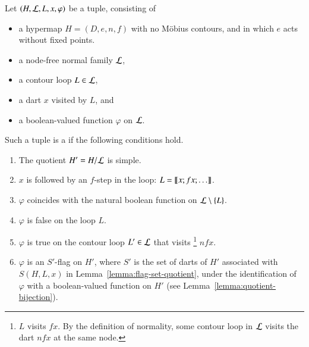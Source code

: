 \begin{definition}\label{def:marked}
Let $(H,{\cal L},L,x,\varphi)$ be a tuple, consisting of 
\begin{itemize}
\item a hypermap $H=(D,e,n,f)$ with no M\"obius contours, and in which $e$ acts without 
fixed points.  %
\item a node-free normal family ${\cal L}$, 
\item a contour loop $L\in{\cal L}$, 
\item a dart $x$ visited by $L$,
and 
\item a  boolean-valued function $\varphi$ on ${\cal L}$.
\end{itemize}
Such a tuple is a  if
the following conditions hold.
\begin{enumerate}
\item The quotient $H'=H/{\cal L}$ is simple.  
\item $x$ is followed by an $f$-step in the loop: $L = {\llbracket{x;fx;\ldots}\rrbracket}$.
\item $\varphi$ coincides with the natural boolean function on ${\cal L}\setminus \{L\}$.
\item $\varphi$ is false on the loop $L$.
\item $\varphi$ is true on the contour loop $L'\in {\cal L}$ that visits%
\footnote{$L$ visits  $f x$.  By the definition of normality, some contour loop in
${\cal L}$ visits the dart $n f x$ at the same node.} 
$n f x$.
\item 
  $\varphi$ is an $S'$-flag on $H'$, where $S'$ is the set of darts of $H'$
  associated with $S(H,L,x)$ in Lemma~\ref{lemma:flag-set-quotient},
  under the identification of $\varphi$ with a boolean-valued
  function on $H'$ (see Lemma~\ref{lemma:quotient-bijection}).
\end{enumerate}
\end{definition}







